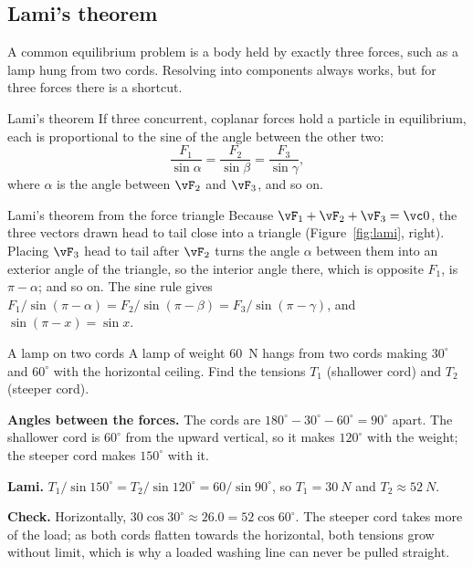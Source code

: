 \subsection{Lami's theorem}

A common equilibrium problem is a body held by exactly three forces, such as a lamp hung from two
cords. Resolving into components always works, but for three forces there is a shortcut.

\begin{keybox}{Lami's theorem}
If three concurrent, coplanar forces hold a particle in equilibrium, each is proportional to the sine of
the angle between the other two:
\[
\frac{F_1}{\sin\alpha}=\frac{F_2}{\sin\beta}=\frac{F_3}{\sin\gamma},
\]
where $\alpha$ is the angle between $\vF_2$ and $\vF_3$, and so on.
\end{keybox}

\begin{derivbox}{Lami's theorem from the force triangle}
Because $\vF_1+\vF_2+\vF_3=\vc0$, the three vectors drawn head to tail close into a triangle (Figure~\ref{fig:lami}, right). Placing
$\vF_3$ head to tail after $\vF_2$ turns the angle $\alpha$ between them into an exterior angle of the
triangle, so the interior angle there, which is opposite $F_1$, is $\pi-\alpha$; and so on. The sine rule gives
$F_1/\sin(\pi-\alpha)=F_2/\sin(\pi-\beta)=F_3/\sin(\pi-\gamma)$, and $\sin(\pi-x)=\sin x$.
\end{derivbox}

\begin{figure}[htbp]
\centering
{}
\end{figure}

\begin{exbox}{A lamp on two cords}\label{ex:lami}
A lamp of weight \SI{60}{N} hangs from two cords making $30^\circ$ and $60^\circ$ with the horizontal
ceiling. Find the tensions $T_1$ (shallower cord) and $T_2$ (steeper cord).

 \textbf{Angles between the forces.} The cords are $180^\circ-30^\circ-60^\circ=90^\circ$ apart.
The shallower cord is $60^\circ$ from the upward vertical, so it makes $120^\circ$ with the weight; the
steeper cord makes $150^\circ$ with it.

 \textbf{Lami.} $T_1/\sin150^\circ=T_2/\sin120^\circ=60/\sin90^\circ$, so $T_1=\SI{30}{N}$ and
$T_2\approx\SI{52}{N}$.

 \textbf{Check.} Horizontally, $30\cos30^\circ\approx26.0=52\cos60^\circ$. The steeper cord takes
more of the load; as both cords flatten towards the horizontal, both tensions grow without limit, which
is why a loaded washing line can never be pulled straight. 
\end{exbox}

